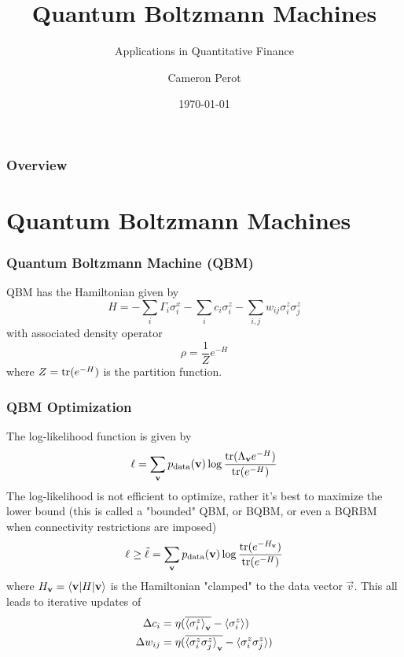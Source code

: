 \documentclass{beamer}
\title{Quantum Boltzmann Machines}
\subtitle{Applications in Quantitative Finance}
\author{Cameron Perot}
\institute{JSC}
\date{\today}
\begin{document}

\maketitle


\begin{frame}
    \frametitle{Overview}
    \tableofcontents
\end{frame}


\section{Quantum Boltzmann Machines}

\begin{frame}
    \frametitle{Quantum Boltzmann Machine (QBM)}
    QBM has the Hamiltonian given by
    \[
        H = -\sum_i \Gamma_i \sigma_i^x -\sum_i c_i \sigma_i^z - \sum_{i,j} w_{ij} \sigma_i^z \sigma_j^z
    \]
    with associated density operator
    \[
        \rho = \frac{1}{Z} e^{-H}
    \]
    where \( Z = \text{tr}(e^{-H}) \) is the partition function.
\end{frame}

\begin{frame}
    \frametitle{QBM Optimization}
    The log-likelihood function is given by
    \[
        \ell = \sum_{\mathbf{v}} p_{\text{data}}(\mathbf{v}) \log\frac{\text{tr}(\Lambda_{\mathbf{v}} e^{-H})}{\text{tr}(e^{-H})}
    \]
    The log-likelihood is not efficient to optimize, rather it's best to maximize the lower bound (this is called a "bounded" QBM, or BQBM, or even a BQRBM when connectivity restrictions are imposed)
    \[
        \ell \ge \tilde{\ell} = \sum_{\mathbf{v}} p_{\text{data}}(\mathbf{v}) \log\frac{\text{tr}(e^{-H_{\mathbf{v}}})}{\text{tr}(e^{-H})}
    \]
    where \( H_{\mathbf{v}} = \braket{\mathbf{v} | H | \mathbf{v}} \) is the Hamiltonian "clamped" to the data vector \( \vec{v} \).
    This all leads to iterative updates of
    \begin{align*}
        \Delta c_i
            &= \eta (\overline{\braket{\sigma_i^z}_{\mathbf{v}}} - \braket{\sigma_i^z}) \\
        \Delta w_{ij}
            &= \eta (\overline{\braket{\sigma_i^z\sigma_j^z}_{\mathbf{v}}} - \braket{\sigma_i^z\sigma_j^z})
    \end{align*}
\end{frame}
\end{document}
